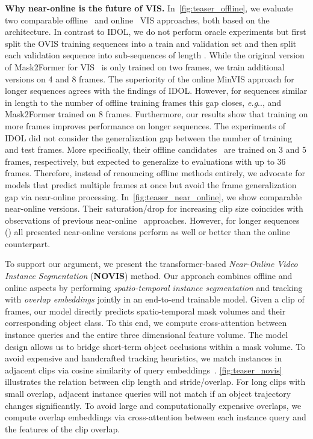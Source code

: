 \documentclass{article}
\makeatletter
\newcommand{\method}{\mbox{NOVIS}}
\theoremstyle{plain}
\theoremstyle{definition}
\theoremstyle{remark}
\DeclareRobustCommand\onedot{\futurelet\@let@token\@onedot}
\def\@onedot{\ifx\@let@token.\else.\null\fi\xspace}
\def\eg{\emph{e.g}\onedot} \def\Eg{\emph{E.g}\onedot}
\makeatother
\begin{document}
\noindent \textbf{Why near-online is the future of VIS.}
In~\cref{fig:teaser_offline}, we evaluate two comparable offline~\cite{mask2former4vis} and online~\cite{huang2022minvis} VIS approaches, both based on the ~\cite{cheng2021mask2former} architecture.
In contrast to IDOL, we do not perform oracle experiments but first split the OVIS training sequences into a train and validation set and then split each validation sequence into sub-sequences of length .
While the original version of Mask2Former for VIS~\cite{mask2former4vis} is only trained on two frames, we train additional versions on 4 and 8 frames.
The superiority of the online MinVIS approach for longer sequences agrees with the findings of IDOL.
However, for sequences similar in length to the number of offline training frames this gap closes, \eg,  and Mask2Former trained on 8 frames.
Furthermore, our results show that training on more frames improves performance on longer sequences.
The experiments of IDOL did not consider the generalization gap between the number of training and test frames.
More specifically, their offline candidates~\cite{seqformer, IFC} are trained on 3 and 5 frames, respectively, but expected to generalize to evaluations with up to 36 frames.
Therefore, instead of renouncing offline methods entirely, we advocate for models that predict multiple frames at once but avoid the frame generalization gap via near-online processing.
In~\cref{fig:teaser_near_online}, we show comparable near-online versions.
Their saturation/drop for increasing clip size coincides with observations of previous near-online~\cite{stem_seg, mask_prop} approaches.
However, for longer sequences () all presented near-online versions perform as well or better than the online counterpart.





To support our argument, we present the transformer-based \emph{Near-Online Video Instance Segmentation} (\textbf{\method{}}) method.
Our approach combines offline and online aspects by performing \emph{spatio-temporal instance segmentation} and tracking with \emph{overlap embeddings} jointly in an end-to-end trainable model.
Given a clip of frames, our model directly predicts spatio-temporal mask volumes and their corresponding object class.
To this end, we compute cross-attention between instance queries and the entire three dimensional feature volume.
The model design allows us to bridge short-term object occlusions within a mask volume.
To avoid expensive and handcrafted tracking heuristics, we match instances in adjacent clips via cosine similarity of query embeddings~\cite{huang2022minvis,IDOL}.
\cref{fig:teaser_novis} illustrates the relation between clip length and stride/overlap.
For long clips with small overlap, adjacent instance queries will not match if an object trajectory changes significantly.
To avoid large and computationally expensive overlaps, we compute overlap embeddings via cross-attention between each instance query and the features of the clip overlap.
\end{document}
